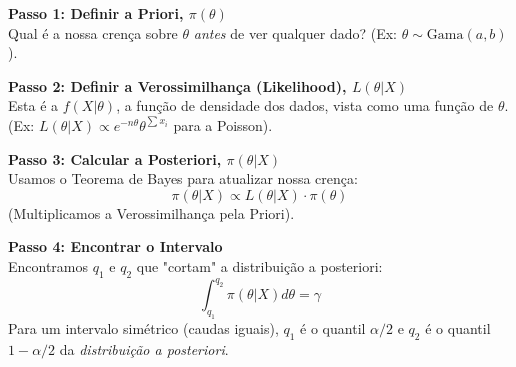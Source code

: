 \documentclass[12pt, a4paper]{article}
\theoremstyle{definition} %
\theoremstyle{remark} %
\begin{document}
\begin{mdframed}[frametitle={A Receita Bayesiana: Construindo um Intervalo de Credibilidade}, style=caixa_bayes]
    \textbf{Passo 1: Definir a Priori, $\pi(\theta)$} \\
    Qual é a nossa crença sobre $\theta$ \textit{antes} de ver qualquer dado? (Ex: $\theta \sim \text{Gama}(a, b)$).

    \textbf{Passo 2: Definir a Verossimilhança (Likelihood), $L(\theta | X)$} \\
    Esta é a $f(X | \theta)$, a função de densidade dos dados, vista como uma função de $\theta$. (Ex: $L(\theta|X) \propto e^{-n\theta} \theta^{\sum x_i}$ para a Poisson).

    \textbf{Passo 3: Calcular a Posteriori, $\pi(\theta | X)$} \\
    Usamos o Teorema de Bayes para atualizar nossa crença:
    $$ \pi(\theta | X) \propto L(\theta | X) \cdot \pi(\theta) $$
    (Multiplicamos a Verossimilhança pela Priori).

    \textbf{Passo 4: Encontrar o Intervalo} \\
    Encontramos $q_1$ e $q_2$ que "cortam" a distribuição a posteriori:
    $$ \int_{q_1}^{q_2} \pi(\theta | X) d\theta = \gamma $$
    Para um intervalo simétrico (caudas iguais), $q_1$ é o quantil $\alpha/2$ e $q_2$ é o quantil $1-\alpha/2$ da \textit{distribuição a posteriori}.
\end{mdframed}
\end{document}
